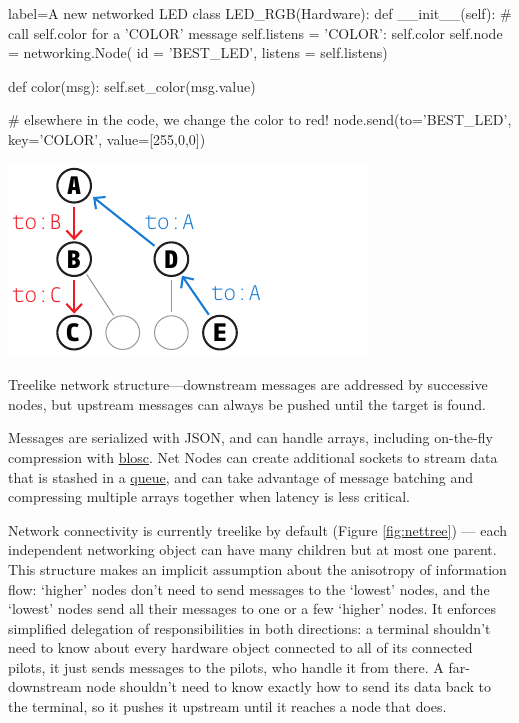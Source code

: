 \begin{pythoncode*}{label=A new networked LED}
class LED_RGB(Hardware):
    def __init__(self):
        # call self.color for a 'COLOR' message
        self.listens = {'COLOR': self.color}
        self.node = networking.Node(
            id      = 'BEST_LED',
            listens = self.listens)
        
    def color(msg):
        self.set_color(msg.value)
        
# elsewhere in the code, we change the color to red!
node.send(to='BEST_LED', key='COLOR', value=[255,0,0])
\end{pythoncode*}

\begin{marginfigure}[0cm]
\includegraphics[]{figures/side_25_tree.pdf}
\caption{Treelike network structure---downstream messages are addressed by successive nodes, but upstream messages can always be pushed until the target is found.}
\label{fig:nettree}
\end{marginfigure}

Messages are serialized with JSON, and can handle arrays, including on-the-fly compression with \href{https://www.blosc.org/}{blosc}. Net Nodes can create additional sockets to stream data that is stashed in a \href{https://docs.python.org/3/library/queue.html\#queue.Queue}{queue}, and can take advantage of message batching and compressing multiple arrays together when latency is less critical.

Network connectivity is currently treelike by default (Figure \ref{fig:nettree}) --- each independent networking object can have many children but at most one parent. This structure makes an implicit assumption about the anisotropy of information flow: `higher' nodes don't need to send messages to the `lowest' nodes, and the `lowest' nodes send all their messages to one or a few `higher' nodes. It enforces simplified delegation of responsibilities in both directions: a terminal shouldn't need to know about every hardware object connected to all of its connected pilots, it just sends messages to the pilots, who handle it from there. A far-downstream node shouldn't need to know exactly how to send its data back to the terminal, so it pushes it upstream until it reaches a node that does.

